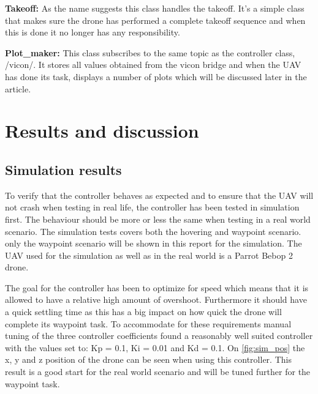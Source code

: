 \documentclass[conference]{IEEEtran}
\begin{document}
\textbf{Takeoff:} As the name suggests this class handles the takeoff. It's a simple class that makes sure the drone has performed a complete takeoff sequence and when this is done it no longer has any responsibility. 

\textbf{Plot\_maker:} This class subscribes to the same topic as the controller class, /vicon/. It stores all values obtained from the vicon bridge and when the UAV has done its task, displays a number of plots which will be discussed later in the article. 

\section{Results and discussion}


\subsection{Simulation results}
To verify that the controller behaves as expected and to ensure that the UAV will not crash when testing in real life, the controller has been tested in simulation first. The behaviour should be more or less the same when testing in a real world scenario. The simulation tests covers both the hovering and waypoint scenario. only the waypoint scenario will be shown in this report for the simulation. The UAV used for the simulation as well as in the real world is a Parrot Bebop 2 drone.

The goal for the controller has been to optimize for speed which means that it is allowed to have a relative high amount of overshoot. Furthermore it should have a quick settling time as this has a big impact on how quick the drone will complete its waypoint task. To accommodate for these requirements manual tuning of the three controller coefficients found a reasonably well suited controller with the values set to: Kp = 0.1, Ki = 0.01 and Kd = 0.1. On \cref{fig:sim_pos} the x, y and z position of the drone can be seen when using this controller. This result is a good start for the real world scenario and will be tuned further for the waypoint task.
\end{document}
